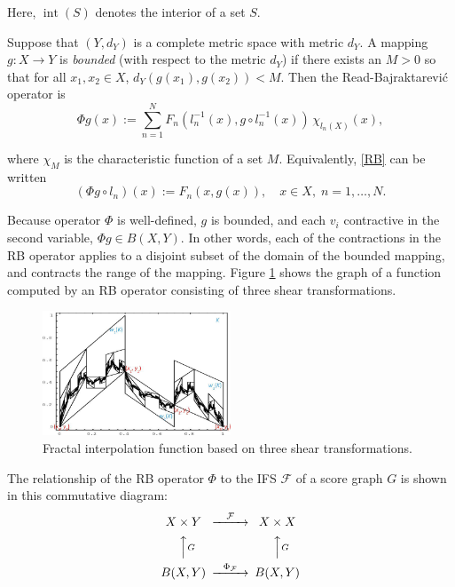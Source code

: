 \documentclass[english,11pt,letterpaper,onecolumn]{scrartcl}
\numberwithin{equation}{section}
\newcommand{\cF}{\mathcal{F}}
\newcommand{\Int}{\mathop{\mathrm{int}}}
\newcommand{\be}{\begin{equation}}
\newcommand{\ee}{\end{equation}}
\begin{document}
\noindent Here, $\Int (S)$ denotes the interior of a set $S$.

Suppose that $(Y,d_Y)$ is a complete metric space with metric $d_Y$. A mapping
$g:X\to Y$ is \emph{bounded} (with respect to the metric $d_Y$) if
there exists an $M > 0$ so that for all $x_1, x_2\in X$, $d_Y(g(x_1),g(x_2)) <
M$. Then the Read-Bajraktarevi\'c operator is
\be\label{RB}
\Phi g (x) := \sum\limits_{n=1}^N F_n (l_n^{-1} (x), g\circ l_n^{-1}
(x))\,\chi_{l_n(X)}(x),
\ee

\noindent where $\chi_M$ is the characteristic function of a set $M$.
Equivalently, \eqref{RB} can be written
\be\label{3.3}
(\Phi g \circ l_n) (x) := F_n (x, g(x)),\quad x\in X, \;n = 1, \ldots, N.
\ee

\noindent Because operator $\Phi$ is well-defined, $g$ is bounded, and each
$v_i$ contractive in the second variable, $\Phi g\in B(X,Y)$.  In other words,
each of the contractions in the RB operator applies to a disjoint subset of the
domain of the bounded mapping, and contracts the range of the mapping. Figure
\ref{fig:fif} shows the graph of a function computed by an RB operator
consisting of three shear transformations.

\begin{figure}
\centerline{\includegraphics[width = 0.5\textwidth]{shearInterpolation}}
\caption{\label{fig:fif}Fractal interpolation function based on three shear
transformations.\protect\footnotemark}
\end{figure}


The relationship of the RB operator $\Phi$ to the IFS $\cF$ of a score graph
$G$ is shown in this commutative diagram:
\be\label{Phi}
\begin{CD}
X\times Y @>\cF>> X\times X\\
@AAGA                  @AAGA\\
B(X,Y) @>\Phi_\cF>>  B(X,Y)
\end{CD}
\ee
\end{document}
